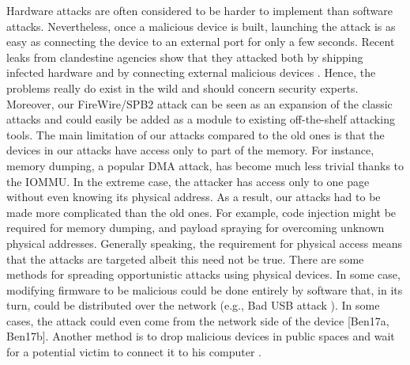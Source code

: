 Hardware attacks are often considered to be harder to implement than software attacks. Nevertheless, once a malicious device is built, launching the attack is as easy as connecting the device to an external port for only a few seconds. Recent leaks from clandestine agencies show that they attacked both by shipping infected hardware \cite{Gal14} and by connecting external malicious devices \cite{Fin14}. Hence, the problems really do exist in the wild and should concern security experts. Moreover, our FireWire/SPB2 attack can be seen as an expansion of the classic attacks and could easily be added as a module to existing off-the-shelf attacking tools.
The main limitation of our attacks compared to the old ones is that the devices in our attacks have access only to part of the memory. For instance, memory dumping, a popular DMA attack, has become much less trivial thanks to the IOMMU. In the extreme case, the attacker has access only to one page without even knowing its physical address. As a result, our attacks had to be made more complicated than the old ones. For example, code injection might be required for memory dumping, and payload spraying for overcoming unknown physical addresses.
Generally speaking, the requirement for physical access means that the attacks are targeted albeit this need not be true. There are some methods for spreading opportunistic attacks using physical devices. In some case, modifying firmware to be malicious could be done entirely by software that, in its turn, could be distributed over the network (e.g., Bad USB attack \cite{NL14}). In some cases, the attack could even come from the network side of the device [Ben17a, Ben17b]. Another method is to drop malicious devices in public spaces and wait for a potential victim to connect it to his computer \cite{TDF16}.
